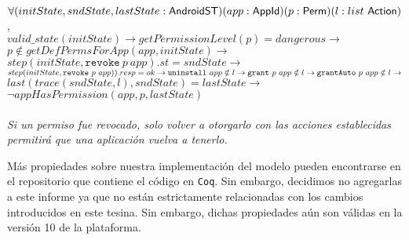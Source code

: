 \begin{prop}
    \mbox{} \\
    $	\forall
        (initState,sndState,lastState:\mathsf{AndroidST})
        (app:\mathsf{AppId})
        (p:\mathsf{Perm})
        (l: list~\mathsf{Action})$, \\
    $	valid\_state(initState) \rightarrow
        getPermissionLevel(p) = dangerous \rightarrow$ \\
    $   p \notin getDefPermsForApp(app,initState) \rightarrow$ \\
    $	step(initState,\texttt{revoke}~p~app).st = sndState \rightarrow$ \\
    $	step(initState, \texttt{revoke}~p~app)).resp=ok \rightarrow \\
        \texttt{uninstall}~app \notin l \rightarrow
        \texttt{grant}~p~app \notin l \rightarrow
        \texttt{grantAuto}~p~app \notin l \rightarrow $\\
    $	last(trace(sndState,l),sndState) = lastState \rightarrow$\\
    $	\neg appHasPermission(app,p,lastState)$ \\ \\
    \textit{Si un permiso fue revocado, solo volver a otorgarlo con las acciones establecidas
        permitirá que una aplicación vuelva a tenerlo.}
\end{prop}

Más propiedades sobre nuestra implementación del modelo pueden encontrarse en el repositorio que
contiene el código en \texttt{Coq}\cite{github-code}. Sin embargo, decidimos no agregarlas a este
informe ya que no están estrictamente relacionadas con los cambios introducidos en este tesina. Sin
embargo, dichas propiedades aún son válidas en la versión 10 de la plataforma.